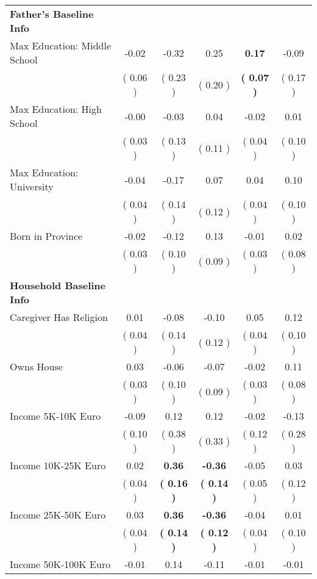 \begin{table}[H]
{\begin{tabular}{lccccc}
\midrule
\textbf{Father's Baseline Info} \\
\quad Max Education: Middle School &     -0.02 &     -0.32 &      0.25 & \textbf{     0.17} &     -0.09 \\
\quad  & (     0.06 ) & (     0.23 )  & (     0.20 )  & \textbf{(     0.07 )} & (     0.17 ) \\
\quad Max Education: High School &     -0.00 &     -0.03 &      0.04 &     -0.02 &      0.01 \\
\quad  & (     0.03 ) & (     0.13 )  & (     0.11 )  & (     0.04 ) & (     0.10 ) \\
\quad Max Education: University &     -0.04 &     -0.17 &      0.07 &      0.04 &      0.10 \\
\quad  & (     0.04 ) & (     0.14 )  & (     0.12 )  & (     0.04 ) & (     0.10 ) \\
\quad Born in Province &     -0.02 &     -0.12 &      0.13 &     -0.01 &      0.02 \\
\quad  & (     0.03 ) & (     0.10 )  & (     0.09 )  & (     0.03 ) & (     0.08 ) \\
\midrule
\textbf{Household Baseline Info} \\
\quad Caregiver Has Religion &      0.01 &     -0.08 &     -0.10 &      0.05 &      0.12 \\
\quad  & (     0.04 ) & (     0.14 )  & (     0.12 )  & (     0.04 ) & (     0.10 ) \\
\quad Owns House &      0.03 &     -0.06 &     -0.07 &     -0.02 &      0.11 \\
\quad  & (     0.03 ) & (     0.10 )  & (     0.09 )  & (     0.03 ) & (     0.08 ) \\
\quad Income 5K-10K Euro &     -0.09 &      0.12 &      0.12 &     -0.02 &     -0.13 \\
\quad  & (     0.10 ) & (     0.38 )  & (     0.33 )  & (     0.12 ) & (     0.28 ) \\
\quad Income 10K-25K Euro &      0.02 & \textbf{     0.36} & \textbf{    -0.36} &     -0.05 &      0.03 \\
\quad  & (     0.04 ) & \textbf{(     0.16 )}  & \textbf{(     0.14 )}  & (     0.05 ) & (     0.12 ) \\
\quad Income 25K-50K Euro &      0.03 & \textbf{     0.36} & \textbf{    -0.36} &     -0.04 &      0.01 \\
\quad  & (     0.04 ) & \textbf{(     0.14 )}  & \textbf{(     0.12 )}  & (     0.04 ) & (     0.10 ) \\
\quad Income 50K-100K Euro &     -0.01 &      0.14 &     -0.11 &     -0.01 &     -0.01 \\

\end{tabular}}
\end{table}

